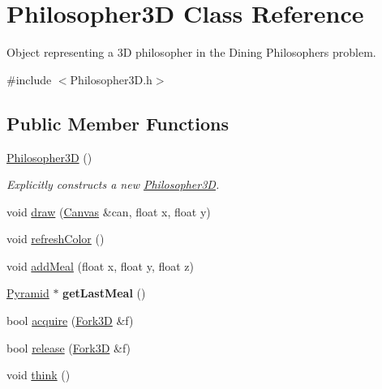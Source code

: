\hypertarget{class_philosopher3_d}{}\section{Philosopher3D Class Reference}
\label{class_philosopher3_d}


Object representing a 3D philosopher in the Dining Philosophers\textquotesingle{} problem.  




{\ttfamily \#include $<$Philosopher3\+D.\+h$>$}

\subsection*{Public Member Functions}
\begin{DoxyCompactItemize}
\item 
\hyperlink{class_philosopher3_d_ac45678c5f33b97bcff814df559ea0ebb}{Philosopher3D} ()
\begin{DoxyCompactList}\small\item\em Explicitly constructs a new \hyperlink{class_philosopher3_d}{Philosopher3D}. \end{DoxyCompactList}\item 
void \hyperlink{class_philosopher3_d_af9321231d363ade9c90bf381650bebb7}{draw} (\hyperlink{classtsgl_1_1_canvas}{Canvas} \&can, float x, float y)
\item 
void \hyperlink{class_philosopher3_d_abadf81910034cbd6757d6fac2d1154a5}{refresh\+Color} ()
\item 
void \hyperlink{class_philosopher3_d_a536c633359c82402055c6264cc8f12cc}{add\+Meal} (float x, float y, float z)
\item 
\mbox{\label{class_philosopher3_d_aecd0b8eba2c5f672f4823b46759fd9d2}} 
\hyperlink{classtsgl_1_1_pyramid}{Pyramid} $\ast$ {\bfseries get\+Last\+Meal} ()
\item 
bool \hyperlink{class_philosopher3_d_a55a0b5fa883f9304e93e386d75b0cb2a}{acquire} (\hyperlink{struct_fork3_d}{Fork3D} \&f)
\item 
bool \hyperlink{class_philosopher3_d_ab6fcdb12fb04651f33005c891f89791e}{release} (\hyperlink{struct_fork3_d}{Fork3D} \&f)
\item 
void \hyperlink{class_philosopher3_d_a586456ca9cc859018aa47564f235c933}{think} ()
\item 
\mbox{\label{class_philosopher3_d_a0fd066c61fec3adfdcd80eea1793fba7}} 

\end{DoxyCompactItemize}
